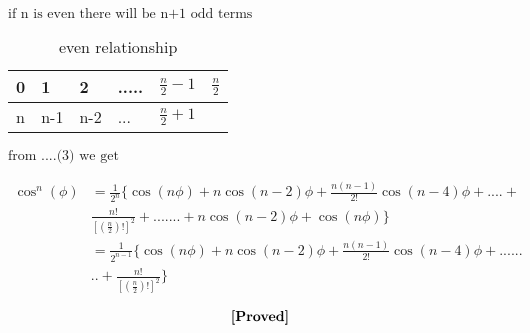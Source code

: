 \documentclass[fleqn]{article}
\begin{document}
$\text{if n is even there will be n+1 odd terms}$

\begin{table}[hbtp]
\caption{even relationship}
\begin{center}
\begin{tabular}{|l|l|l|l|l|l|}

\hline
0 & 1 & 2 &..... &$\frac{n}{2}-1$ & $\frac{n}{2}$\\
\hline
n & n-1 & n-2 &...&$\frac{n}{2}+1$ & \\
\hline

\end{tabular}
\end{center}
\end{table}

\vspace{1.5 in}

$\text{from ....(3) we get}$

\begin{align*}
\cos^{n}(\phi) &= \frac{1}{2^{n}}\{\cos(n\phi)+n\cos(n-2)\phi+\frac{n(n-1)}{2!}\cos(n-4)\phi+....+\\
			   & \frac{n!}{[(\frac{n}{2})!]^{2}}+.......+n\cos(n-2)\phi+\cos(n\phi)\}\\	
			   &= \frac{1}{2^{n-1}}\{\cos(n\phi)+n\cos(n-2)\phi+\frac{n(n-1)}{2!}\cos(n-4)\phi+......\\
			   &..+\frac{n!}{[(\frac{n}{2})!]^{2}} \}   
\end{align*}

$$\text{\textbf{[Proved]}}$$
\end{document}
